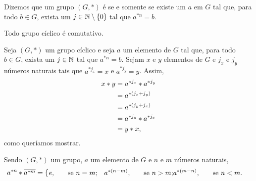 \begin{Def}
  Dizemos que um grupo $(G,\ast)$ é  se
  e somente se existe um $a$ em $G$ tal que, para todo $b\in G$, exista
  um $j\in\mathbb{N}\setminus\left\{ 0 \right\}$ tal que $a^{\ast n}=b$.
\end{Def}

\begin{Teo}
  Todo grupo cíclico é comutativo.
\end{Teo}

\begin{dem}
  Seja $(G,\ast)$ um grupo cíclico e seja $a$ um elemento de $G$ tal
  que, para todo $b\in G$, exista um $j\in\mathbb{N}$ tal que $a^{\ast
  n}=b$. Sejam $x$ e $y$ elementos de $G$ e $j_x$ e $j_y$ números
  naturais tais que $a^{\ast j_x}=x$ e $a^{\ast j_y}=y$. Assim,
  \begin{equation*}
    \begin{aligned}
      x\ast y &= a^{\ast j_x}\ast a^{\ast j_y}\\
              &= a^{\ast(j_x+j_y)}\\
              &= a^{\ast(j_y+j_x)}\\
              &= a^{\ast j_y}\ast a^{\ast j_x}\\
              &= y\ast x\mathrm{,}
    \end{aligned}
  \end{equation*}
  como queríamos mostrar.
\end{dem}

\begin{Lem}\label{lemanastoveram}
  Sendo $(G,\ast)$ um grupo, $a$ um elemento de $G$ e
  $n$ e $m$ números naturais,
  \begin{equation*}
    a^{\ast n}\ast \overline{a^{\ast m}} = \left\{
    \begin{aligned}
      &e\mathrm{,}&\quad&\text{se $n=m$;}
      &a^{\ast (n-m)}\mathrm{,}&\quad&\text{se $n>m$;}
      &a^{\ast (m-n)}\mathrm{,}&\quad&\text{se $n<m$.}
    \end{aligned}
    \right.
  \end{equation*}
\end{Lem}

